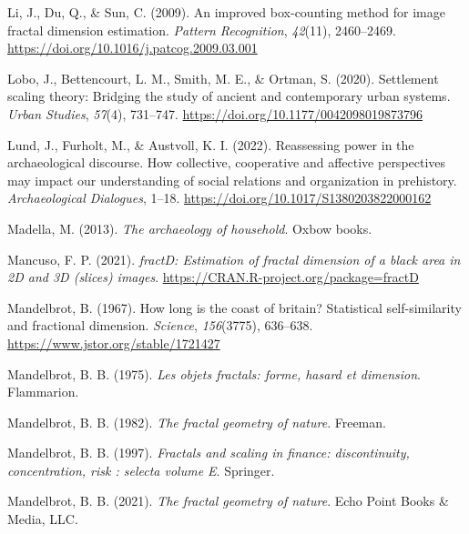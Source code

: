 \documentclass[
  12pt,
]{book}
\newlength{\cslhangindent}
\newlength{\cslentryspacingunit} %
\newenvironment{CSLReferences}[2] %
 {%
  \setlength{\parindent}{0pt}
  \ifodd #1
  \let\oldpar\par
  \def\par{\hangindent=\cslhangindent\oldpar}
  \fi
  \setlength{\parskip}{#2\cslentryspacingunit}
 }%
 {}
\begin{document}
\begin{CSLReferences}{1}{0}
\leavevmode{}%
Li, J., Du, Q., \& Sun, C. (2009). An improved box-counting method for image fractal dimension estimation. \emph{Pattern Recognition}, \emph{42}(11), 2460--2469. \url{https://doi.org/10.1016/j.patcog.2009.03.001}

\leavevmode{}%
Lobo, J., Bettencourt, L. M., Smith, M. E., \& Ortman, S. (2020). Settlement scaling theory: Bridging the study of ancient and contemporary urban systems. \emph{Urban Studies}, \emph{57}(4), 731--747. \url{https://doi.org/10.1177/0042098019873796}

\leavevmode{}%
Lund, J., Furholt, M., \& Austvoll, K. I. (2022). Reassessing power in the archaeological discourse. How collective, cooperative and affective perspectives may impact our understanding of social relations and organization in prehistory. \emph{Archaeological Dialogues}, 1--18. \url{https://doi.org/10.1017/S1380203822000162}

\leavevmode{}%
Madella, M. (2013). \emph{The archaeology of household}. Oxbow books.

\leavevmode{}%
Mancuso, F. P. (2021). \emph{fractD: Estimation of fractal dimension of a black area in 2D and 3D (slices) images}. \url{https://CRAN.R-project.org/package=fractD}

\leavevmode{}%
Mandelbrot, B. (1967). How long is the coast of britain? Statistical self-similarity and fractional dimension. \emph{Science}, \emph{156}(3775), 636--638. \url{https://www.jstor.org/stable/1721427}

\leavevmode{}%
Mandelbrot, B. B. (1975). \emph{Les objets fractals: forme, hasard et dimension}. Flammarion.

\leavevmode{}%
Mandelbrot, B. B. (1982). \emph{The fractal geometry of nature}. Freeman.

\leavevmode{}%
Mandelbrot, B. B. (1997). \emph{Fractals and scaling in finance: discontinuity, concentration, risk : selecta volume E}. Springer.

\leavevmode{}%
Mandelbrot, B. B. (2021). \emph{The fractal geometry of nature}. Echo Point Books \& Media, LLC.


\end{CSLReferences}
\end{document}
